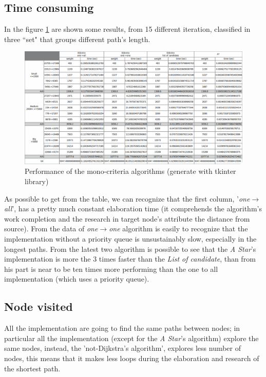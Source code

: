 \documentclass[a4paper,11pt]{report}
\begin{document}
\subsection{Time consuming} 
In the figure \ref{fig:monoCriteriaOutput} are shown some results, from 15 different iteration, classified in three ``set" that groups different path's length.
\begin{figure}[H]
	\centering
	\includegraphics[width=\linewidth]{monoCriteriaOutput.png}
	\caption{Performance of the mono-criteria algorithms (generate with tkinter library)}
	\label{fig:monoCriteriaOutput}
\end{figure}
As possible to get from the table, we can recognize that the first column, '\textit{one$\to$all}', has a pretty much constant elaboration time (it comprehends the algorithm's work completion and the research in target node's attribute the distance from source). From the data of \textit{one$\to$one} algorithm is easily to recognize that the implementation without a priority queue is unsustainably slow, especially in the longest paths. From the latest two algorithm is possible to see that the \textit{A Star}'s implementation is more the 3 times faster than the \textit{List of candidate}, than from his part is near to be ten times more performing than the one to all implementation (which uses a priority queue).

\subsection{Node visited}

All the implementation are going to find the same paths between nodes; in particular all the implementation (except for the \textit{A Star}'s algorithm) explore the same nodes, instead, the 'not-Dijkstra's algorithm', explores less number of nodes, this means that it makes less loops during the elaboration and research of the shortest path.
\end{document}
